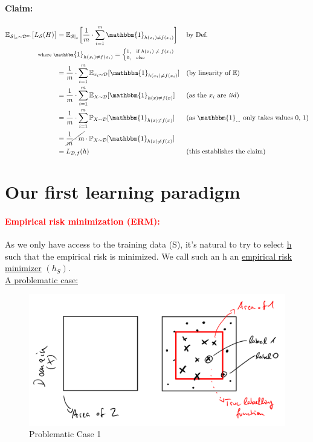 \documentclass[10pt,a4paper]{article}
\theoremstyle{definition}
\theoremstyle{plain}
\begin{document}
\paragraph{Claim:}
\begin{align*}
 \mathbb{E}_{\mathcal{S}|_x \sim \mathcal{D}^m}\big[L_\mathcal{S}(H)\big] &= \mathbb{E}_{\mathcal{S}|_x}\bigg[\frac{1}{m} \cdot \sum_{i=1}^{m} \mathbbm{1}_{h(x_i) \neq f(x_i)}\bigg]  &&  \text{by Def.}\\
 & \hspace{-1cm}\scriptsize{\text{where } \mathbbm{1}_{h(x_i) \neq f(x_i)} = \begin{cases} 1 , &  \text{if $h(x_i) \neq f(x_i)$} \\ 0 , & \text{else} \end{cases}}\\
 &= \frac{1}{m} \cdot \sum_{i=1}^{m} \mathbb{E}_{x_i \sim \mathcal{D}}[\mathbbm{1}_{h(x_i) \neq f(x_i)}] && \text{(by linearity of $\mathbb{E}$)}\\
 &= \frac{1}{m} \cdot \sum_{i=1}^{m} \mathbb{E}_{X \sim \mathcal{D}}[\mathbbm{1}_{h(x) \neq f(x)}] && \text{(as the $x_i$ are \textit{iid})}\\
 &= \frac{1}{m} \cdot \sum_{i=1}^{m} \mathbb{P}_{X\sim \mathcal{D}}[\mathbbm{1}_{h(x) \neq f(x)}] && \text{(as $\mathbbm{1}_{...}$ only takes values 0, 1)}\\
 &=  \cancel{\frac{1}{m} \cdot m} \cdot \mathbb{P}_{X\sim \mathcal{D}}[\mathbbm{1}_{h(x) \neq f(x)}]\\
 &= L_{\mathcal{D},f}(h) && \text{(this establishes the claim)}
\end{align*}

\section*{Our first learning paradigm} 
\paragraph{\textcolor{red}{Empirical risk minimization (ERM):}} As we only have access to the training data (S), it's natural to try to select \underline{h} such that the empirical risk is minimized. We call such an h an \underline{empirical risk minimizer} $(h_S)$.\\

\underline{A problematic case:}
\begin{figure}[H]
	\centering
	\includegraphics[width=0.7\linewidth]{sketch_1}
	\caption{Problematic Case 1}
	\label{fig:sketch1}
\end{figure}
\end{document}
